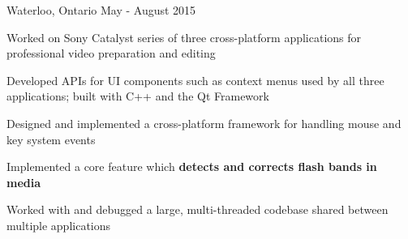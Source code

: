 \begin{cventries}
    {Waterloo, Ontario}
    {May - August 2015}
    {
      \begin{cvitems}
        \item Worked on Sony Catalyst series of three cross-platform applications for professional video preparation and editing
        \item Developed APIs for UI components such as context menus used by all three applications; built with C++ and the Qt Framework
        \item Designed and implemented a cross-platform framework for handling mouse and key system events
        \item Implemented a core feature which \textbf{detects and corrects flash bands in media}
        \item Worked with and debugged a large, multi-threaded codebase shared between multiple applications
      \end{cvitems}
    }
\end{cventries}

